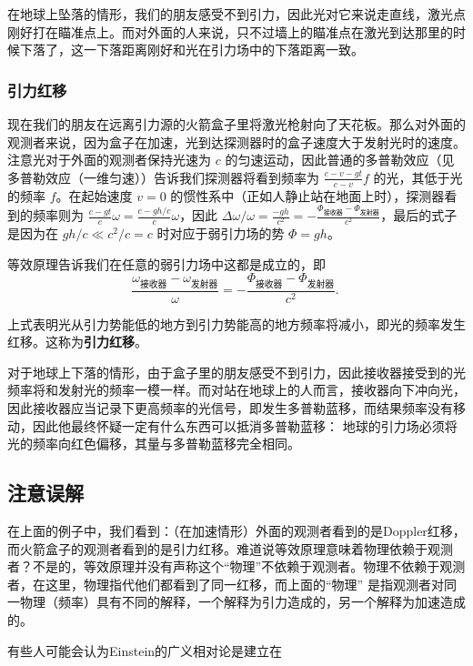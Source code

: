 在地球上坠落的情形，我们的朋友感受不到引力，因此光对它来说走直线，激光点刚好打在瞄准点上。而对外面的人来说，只不过墙上的瞄准点在激光到达那里的时候下落了，这一下落距离刚好和光在引力场中的下落距离一致。

\subsubsection{引力红移}
现在我们的朋友在远离引力源的火箭盒子里将激光枪射向了天花板。那么对外面的观测者来说，因为盒子在加速，光到达探测器时的盒子速度大于发射光时的速度。注意光对于外面的观测者保持光速为 $c$ 的匀速运动，因此普通的多普勒效应（见多普勒效应（一维匀速））告诉我们探测器将看到频率为 $\frac{c-v-gt}{c-v}f$ 的光，其低于光的频率 $f$。在起始速度 $v=0$ 的惯性系中（正如人静止站在地面上时），探测器看到的频率则为 $\frac{c-gt}{c}\omega=\frac{c-gh/c}{c}\omega$，因此
$\Delta \omega/\omega=\frac{-gh}{c^2}=-\frac{\Phi_{\text{接收器}}-\Phi_{\text{发射器}}}{c^2}$，最后的式子是因为在 $gh/c\ll c^2/c=c$ 时对应于弱引力场的势 $\Phi=gh$。

等效原理告诉我们在任意的弱引力场中这都是成立的，即
\begin{equation}
\frac{\omega_{\text{接收器}}-\omega_{\text{发射器}}}{\omega}=-\frac{\Phi_{\text{接收器}}-\Phi_{\text{发射器}}}{c^2}.~
\end{equation}

上式表明光从引力势能低的地方到引力势能高的地方频率将减小，即光的频率发生红移。这称为\textbf{引力红移}。

对于地球上下落的情形，由于盒子里的朋友感受不到引力，因此接收器接受到的光频率将和发射光的频率一模一样。而对站在地球上的人而言，接收器向下冲向光，因此接收器应当记录下更高频率的光信号，即发生多普勒蓝移，而结果频率没有移动，因此他最终怀疑一定有什么东西可以抵消多普勒蓝移：
地球的引力场必须将光的频率向红色偏移，其量与多普勒蓝移完全相同。

\subsection{注意误解}
在上面的例子中，我们看到：（在加速情形）外面的观测者看到的是Doppler红移，而火箭盒子的观测者看到的是引力红移。难道说等效原理意味着物理依赖于观测者？不是的，等效原理并没有声称这个“物理”不依赖于观测者。物理不依赖于观测者，在这里，物理指代他们都看到了同一红移，而上面的“物理” 是指观测者对同一物理（频率）具有不同的解释，一个解释为引力造成的，另一个解释为加速造成的。

有些人可能会认为Einstein的广义相对论是建立在




